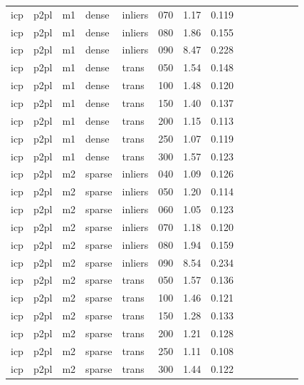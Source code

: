 \begin{table}[htbp]
\begin{tabular}{llllllrrrrrrrr}
  icp & p2pl & m1 & dense & inliers & 070 & 1.17 & 0.119 \\
  icp & p2pl & m1 & dense & inliers & 080 & 1.86 & 0.155 \\
  icp & p2pl & m1 & dense & inliers & 090 & 8.47 & 0.228 \\
  icp & p2pl & m1 & dense & trans & 050 & 1.54 & 0.148 \\
  icp & p2pl & m1 & dense & trans & 100 & 1.48 & 0.120 \\
  icp & p2pl & m1 & dense & trans & 150 & 1.40 & 0.137 \\
  icp & p2pl & m1 & dense & trans & 200 & 1.15 & 0.113 \\
  icp & p2pl & m1 & dense & trans & 250 & 1.07 & 0.119 \\
  icp & p2pl & m1 & dense & trans & 300 & 1.57 & 0.123 \\
  icp & p2pl & m2 & sparse & inliers & 040 & 1.09 & 0.126 \\
  icp & p2pl & m2 & sparse & inliers & 050 & 1.20 & 0.114 \\
  icp & p2pl & m2 & sparse & inliers & 060 & 1.05 & 0.123 \\
  icp & p2pl & m2 & sparse & inliers & 070 & 1.18 & 0.120 \\
  icp & p2pl & m2 & sparse & inliers & 080 & 1.94 & 0.159 \\
  icp & p2pl & m2 & sparse & inliers & 090 & 8.54 & 0.234 \\
  icp & p2pl & m2 & sparse & trans & 050 & 1.57 & 0.136 \\
  icp & p2pl & m2 & sparse & trans & 100 & 1.46 & 0.121 \\
  icp & p2pl & m2 & sparse & trans & 150 & 1.28 & 0.133 \\
  icp & p2pl & m2 & sparse & trans & 200 & 1.21 & 0.128 \\
  icp & p2pl & m2 & sparse & trans & 250 & 1.11 & 0.108 \\
  icp & p2pl & m2 & sparse & trans & 300 & 1.44 & 0.122 \\
\bottomrule
\end{tabular}
\end{table}
